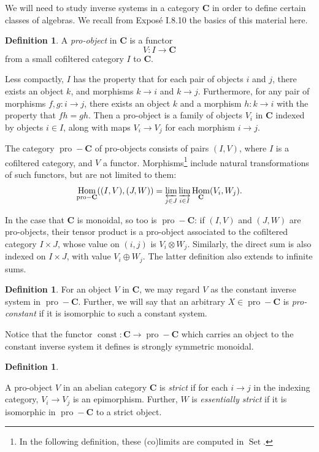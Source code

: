 \documentclass[12pt]{article}
\DeclareMathOperator{\Hom}{Hom}
\DeclareMathOperator{\Set}{Set}
\DeclareMathOperator{\const}{const}
\DeclareMathOperator{\pro}{pro}
\newcommand{\bC} {\mathbf{C}}
\newcommand{\proC}{\pro\!-\bC}
\theoremstyle{plain}
\theoremstyle{definition}
\newtheorem{defn}[thm]{Definition}
\theoremstyle{remark}
\begin{document}
We will need to study inverse systems in a category $\bC$ in order to define certain classes of  algebras.  We recall from \cite{SGA4tome1} Expos\'e I.8.10 the basics of this material here.  

\begin{defn} A \emph{pro-object} in $\bC$ is a functor 
%
$$V: I \to \bC$$
%
from a small cofiltered category $I$ to $\bC$.  \end{defn}

Less compactly, $I$ has the property that for each pair of objects $i$ and $j$, there exists an object $k$, and morphisms $k \to i$ and $k \to j$.  Furthermore, for any pair of morphisms $f, g: i \to j$, there exists an object $k$ and a morphism $h:k \to i$ with the property that $fh = gh$.  Then a pro-object is a family of objects $V_i$ in $\bC$ indexed by objects $i \in I$, along with maps $V_i \to V_j$ for each morphism $i \to j$.

The category $\proC$ of pro-objects consists of pairs $(I, V)$, where $I$ is a cofiltered category, and $V$ a functor.  Morphisms\footnote{In the following definition, these (co)limits are computed in $\Set$.} include natural transformations of such functors, but are not limited to them:
%
$$\Hom_{\proC}((I, V), (J, W)) = \varprojlim_{j\in J} \varinjlim_{i \in I} \Hom_{\bC}(V_i, W_j).$$

In the case that $\bC$ is monoidal, so too is $\proC$: if $(I, V)$ and $(J, W)$ are pro-objects, their tensor product is a pro-object associated to the cofiltered category $I \times J$, whose value on $(i, j)$ is $V_i \otimes W_j$.  Similarly, the direct sum is also indexed on $I \times J$, with value $V_i \oplus W_j$.  The latter definition also extends to infinite sums.

\begin{defn} 
For an object $V$ in $\bC$, we may regard $V$ as the constant inverse system in $\proC$.  Further, we will say that an arbitrary $X\in \proC$ is \emph{pro-constant} if it is isomorphic to such a constant system.
\end{defn}

Notice that the functor $\const: \bC \to \proC$ which carries an object to the constant inverse system it defines is strongly symmetric monoidal.


\begin{defn} \label{strict_defn}

A pro-object $V$ in an abelian category $\bC$ is \emph{strict} if for each $i \to j$ in the indexing category, $V_i \to V_j$ is an epimorphism.  Further, $W$ is \emph{essentially strict} if it is isomorphic in $\proC$ to a strict object.

\end{defn}
\end{document}
